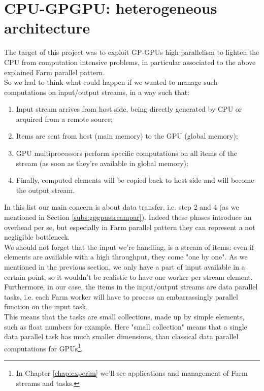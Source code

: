 \section{CPU-GPGPU: heterogeneous architecture}
	The target of this project was to exploit GP-GPUs high parallelism to lighten the CPU from computation intensive problems, in particular associated to the above explained Farm parallel pattern.\\
	So we had to think what could happen if we wanted to manage such computations on input/output streams, in a way such that:
	\begin{enumerate}
		\item Input stream arrives from host side, being directly generated by CPU or acquired from a remote source;
		
		\item Items are sent from host (main memory) to the GPU (global memory);
		
		\item GPU multiprocessors perform specific computations on all items of the stream (as soon as they're available in global memory);
		
		\item Finally, computed elements will be copied back to host side and will become the output stream. \\
	\end{enumerate}
	In this list our main concern is about data transfer, i.e. step 2 and 4 (as we mentioned in Section \ref{subs:gpgpustreampar}). 
	Indeed these phases introduce an overhead per se, but especially in Farm parallel pattern they can represent a not negligible bottleneck. \\
	We should not forget that the input we're handling, is a stream of items: even if elements are available with a high throughput, they come "one by one". As we mentioned in the previous section, we only have a part of input available in a certain point, so it wouldn't be realistic to have one worker per stream element.\\
	Furthermore, in our case, the items in the input/output streams are data parallel tasks, i.e. each Farm worker will have to process an embarrassingly parallel function on the input task.\\
	This means that the tasks are small collections, made up by simple elements, such as float numbers for example. Here "small collection" means that a single data parallel task has much smaller dimensions, than classical data parallel computations for GPUs\footnote{In Chapter \ref{chap:experim} we'll see applications and management of Farm streams and tasks.}.\\
	
